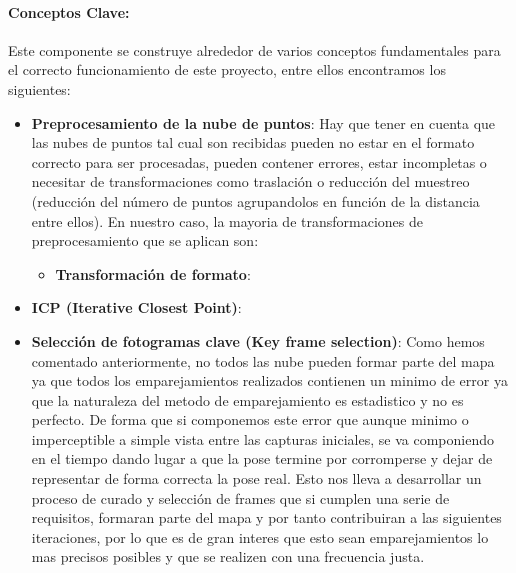 \documentclass[12pt, a4paper, twoside]{article}
\begin{document}
\paragraph{Conceptos Clave:}
Este componente se construye alrededor de varios conceptos fundamentales para el correcto funcionamiento de este proyecto, entre ellos encontramos los 
siguientes:
\begin{itemize}
  \item \textbf{Preprocesamiento de la nube de puntos}: Hay que tener en cuenta que las nubes de puntos tal cual son recibidas pueden no estar en el formato 
  correcto para ser procesadas, pueden contener errores, estar incompletas o necesitar de transformaciones como traslación o reducción del muestreo (reducción 
  del número de puntos agrupandolos en función de la distancia entre ellos). En nuestro caso, la mayoria de transformaciones de preprocesamiento que se aplican 
  son:
  \begin{itemize}
    \item \textbf{Transformación de formato}: 
  \end{itemize}
  \item \textbf{ICP (Iterative Closest Point)}:
  \item \textbf{Selección de fotogramas clave (Key frame selection)}: Como hemos comentado anteriormente, no todos las nube pueden formar parte del mapa ya 
  que todos los emparejamientos realizados contienen un minimo de error ya que la naturaleza del metodo de emparejamiento es estadistico y no es perfecto. De 
  forma que si componemos este error que aunque minimo o imperceptible a simple vista entre las capturas iniciales, se va componiendo en el tiempo dando lugar 
  a que la pose termine por corromperse y dejar de representar de forma correcta la pose real. \newline
  Esto nos lleva a desarrollar un proceso de curado y selección de frames que si cumplen una serie de requisitos, formaran parte del mapa y por tanto contribuiran 
  a las siguientes iteraciones, por lo que es de gran interes que esto sean emparejamientos lo mas precisos posibles y que se realizen con una frecuencia justa. 
\end{itemize}
\end{document}
